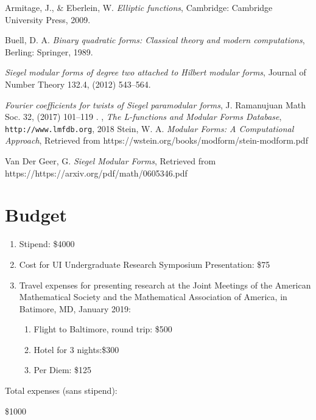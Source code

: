 \documentclass[11pt, oneside]{amsart}
\begin{document}
\pagebreak

\begin{thebibliography}{XXXX}
	
 {Armitage, J., \& Eberlein, W.} {\em Elliptic functions}, Cambridge: Cambridge University Press, 2009.

 {Buell, D. A.} {\em Binary quadratic forms: Classical theory and modern computations}, Berling: Springer, 1989.

 {\em Siegel modular forms of degree two attached to Hilbert modular forms}, Journal of Number Theory  132.4, (2012) 543--564.

 {\em Fourier coefficients for twists of Siegel paramodular forms}, J. 
Ramanujuan Math Soc. 32,  (2017) 101--119 .
, {\em The L-functions and Modular Forms Database}, \texttt{http://www.lmfdb.org}, 2018
 {Stein, W. A.} {\em Modular Forms: A Computational Approach}, Retrieved from https://wstein.org/books/modform/stein-modform.pdf

 {Van Der Geer, G.} {\em Siegel Modular Forms}, Retrieved from https://https://arxiv.org/pdf/math/0605346.pdf




\end{thebibliography}

\pagebreak
\section{Budget}

\begin{enumerate}

\item Stipend: \$4000

\item Cost for UI Undergraduate Research Symposium Presentation: \$75

\item Travel expenses for presenting research at the Joint Meetings of the American Mathematical Society and the Mathematical Association of America, in Batimore, MD, January 2019:
\begin{enumerate}

\item Flight to Baltimore, round trip: \$500

\item Hotel for 3 nights:\$300

\item Per Diem: \$125

\end{enumerate}

\end{enumerate}

Total expenses (sans stipend):

\$1000
\end{document}
